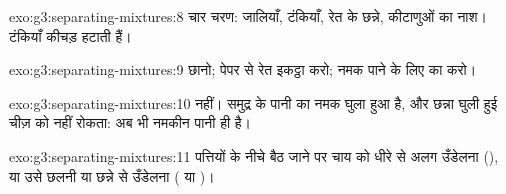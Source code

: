 \begin{solution}{exo:g3:separating-mixtures:8}
चार चरण: जालियाँ,  टंकियाँ, रेत के छन्ने, कीटाणुओं का नाश।
 टंकियाँ कीचड़ हटाती हैं।
\end{solution}

\begin{solution}{exo:g3:separating-mixtures:9}
छानो; पेपर से रेत इकट्ठा करो; नमक पाने के लिए  का
 करो।
\end{solution}

\begin{solution}{exo:g3:separating-mixtures:10}
नहीं। समुद्र के पानी का नमक घुला हुआ है, और छन्ना घुली हुई चीज़ को नहीं
रोकता:  अब भी नमकीन पानी ही है।
\end{solution}

\begin{solution}{exo:g3:separating-mixtures:11}
पत्तियों के नीचे बैठ जाने पर चाय को धीरे से अलग उँडेलना (), या
उसे छलनी या छन्ने से उँडेलना ( या )।
\end{solution}

